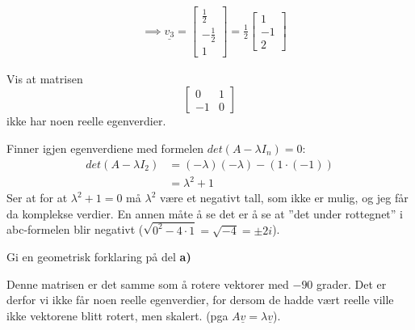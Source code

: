 \documentclass[11pt, a4paper, norsk]{NTNUoving}
\begin{document}
\begin{oppgave}
\begin{punkt}
\begin{align*}
                \\
                &\implies \underline{v_3} = \begin{bmatrix}
                    \frac{1}{2}\\
                    -\frac{1}{2}\\
                    1
                \end{bmatrix} = \frac{1}{2} \begin{bmatrix}
                    1 \\
                    -1 \\
                    2
                \end{bmatrix}
            \end{align*}
        \end{punkt}
    \end{oppgave}

    \begin{oppgave}
        \begin{punkt}
            Vis at matrisen $$\begin{bmatrix}
                0 & 1 \\
                -1 & 0
            \end{bmatrix}$$ ikke har noen reelle egenverdier.

            Finner igjen egenverdiene med formelen $det(A - \lambda I_{n}) = 0$:
            \begin{align*}
                det(A - \lambda I_2) &= (-\lambda)(-\lambda) - (1 \cdot (-1)) \\
                                     &= \lambda^2 +1
            \end{align*}
            Ser at for at $\lambda^2 + 1 = 0$ må $\lambda^2$ være et negativt tall, som ikke er mulig, og jeg får da komplekse verdier. En annen måte å se det er å se at ''det under rottegnet'' i abc-formelen blir negativt ($\sqrt{0^2 - 4 \cdot 1} = \sqrt{-4} = \pm 2i$). 
        \end{punkt}
        \begin{punkt}
            Gi en geometrisk forklaring på del \textbf{a)}

            Denne matrisen er det samme som å rotere vektorer med $-90$ grader. Det er derfor vi ikke får noen reelle egenverdier, for dersom de hadde vært reelle ville ikke vektorene blitt rotert, men skalert. (pga $A\underline{v} = \lambda\underline{v}$). 
        \end{punkt}
    \end{oppgave}
\end{document}
